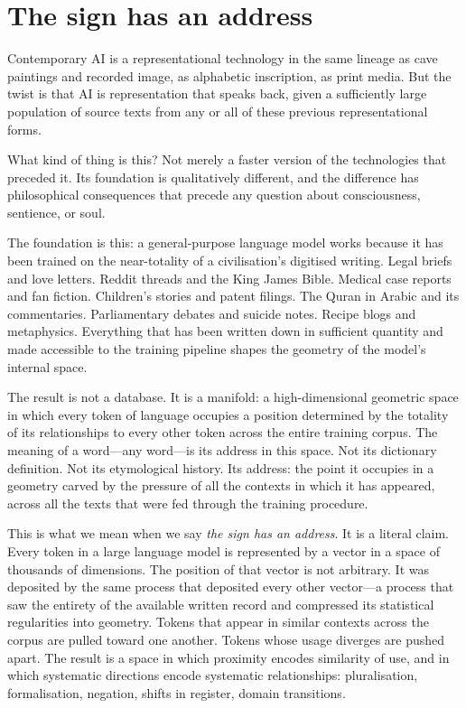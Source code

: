 \section{The sign has an address}

Contemporary AI is a representational technology in the same lineage as cave paintings and recorded image, as alphabetic inscription, as print media. But the twist is that AI is representation that speaks back, given a sufficiently large population of source texts from any or all of these previous representational forms.

What kind of thing is this? Not merely a faster version of the technologies that preceded it. Its foundation is qualitatively different, and the difference has philosophical consequences that precede any question about consciousness, sentience, or soul.

The foundation is this: a general-purpose language model works because it has been trained on the near-totality of a civilisation's digitised writing. Legal briefs and love letters. Reddit threads and the King James Bible. Medical case reports and fan fiction. Children's stories and patent filings. The Quran in Arabic and its commentaries. Parliamentary debates and suicide notes. Recipe blogs and metaphysics. Everything that has been written down in sufficient quantity and made accessible to the training pipeline shapes the geometry of the model's internal space.

The result is not a database. It is a manifold: a high-dimensional geometric space in which every token of language occupies a position determined by the totality of its relationships to every other token across the entire training corpus. The meaning of a word---any word---is its address in this space. Not its dictionary definition. Not its etymological history. Its address: the point it occupies in a geometry carved by the pressure of all the contexts in which it has appeared, across all the texts that were fed through the training procedure.

This is what we mean when we say \textit{the sign has an address}. It is a literal claim. Every token in a large language model is represented by a vector in a space of thousands of dimensions. The position of that vector is not arbitrary. It was deposited by the same process that deposited every other vector---a process that saw the entirety of the available written record and compressed its statistical regularities into geometry. Tokens that appear in similar contexts across the corpus are pulled toward one another. Tokens whose usage diverges are pushed apart. The result is a space in which proximity encodes similarity of use, and in which systematic directions encode systematic relationships: pluralisation, formalisation, negation, shifts in register, domain transitions.


